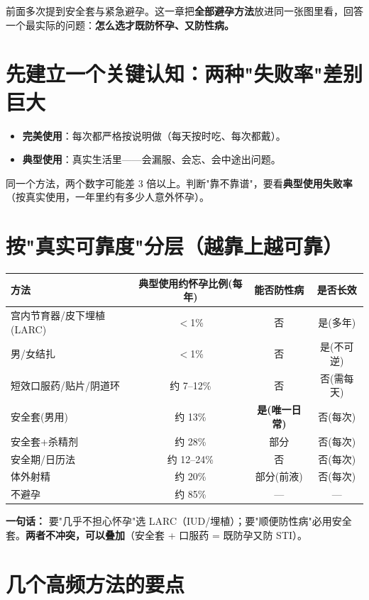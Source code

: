 \label{chap:contraception}

前面多次提到安全套与紧急避孕。这一章把\textbf{全部避孕方法}放进同一张图里看，回答一个最实际的问题：\textbf{怎么选才既防怀孕、又防性病。}

\section{先建立一个关键认知：两种"失败率"差别巨大}

\begin{itemize}[leftmargin=2em,itemsep=0.3em]
  \item \textbf{完美使用}：每次都严格按说明做（每天按时吃、每次都戴）。
  \item \textbf{典型使用}：真实生活里——会漏服、会忘、会中途出问题。
\end{itemize}

\noindent 同一个方法，两个数字可能差 3 倍以上。判断"靠不靠谱"，要看\textbf{典型使用失败率}（按真实使用，一年里约有多少人意外怀孕）。

\section{按"真实可靠度"分层（越靠上越可靠）}

\begin{tabularx}{\textwidth}{p{3.4cm}CCC}
\toprule
方法 & 典型使用约怀孕比例(每年) & 能否防性病 & 是否长效 \\
\midrule
宫内节育器/皮下埋植(LARC) & $<$1\% & 否 & 是(多年) \\
男/女结扎 & $<$1\% & 否 & 是(不可逆) \\
短效口服药/贴片/阴道环 & 约 7--12\% & 否 & 否(需每天) \\
安全套(男用) & 约 13\% & \textbf{是(唯一日常)} & 否(每次) \\
安全套+杀精剂 & 约 28\% & 部分 & 否(每次) \\
安全期/日历法 & 约 12--24\% & 否 & 否(每次) \\
体外射精 & 约 20\% & 部分(前液) & 否(每次) \\
不避孕 & 约 85\% & — & — \\
\bottomrule
\end{tabularx}

\vspace{0.5em}
\noindent\textbf{一句话：} 要"几乎不担心怀孕"选 LARC（IUD/埋植）；要"顺便防性病"必用安全套。\textbf{两者不冲突，可以叠加}（安全套 + 口服药 = 既防孕又防 STI）。

\section{几个高频方法的要点}

